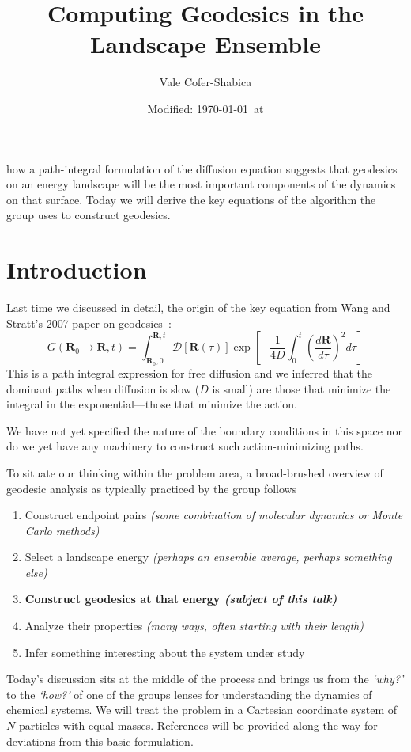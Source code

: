 \documentclass[letterpaper]{tufte-handout}
\title{Computing Geodesics in the Landscape Ensemble}
\date{Modified: \today\ at \currenttime}
\author{Vale Cofer-Shabica}
\newcommand{\laeq}[1]{\label{eqn:#1}}
\renewcommand{\vec}[1]{\mathbf{#1}}
\begin{document}
\maketitle

 how a path-integral formulation of the diffusion equation suggests that geodesics on an energy landscape will be the most important components of the dynamics on that surface. Today we will derive the key equations of the algorithm the group uses to construct geodesics.

\section{Introduction}
Last time we discussed in detail, the origin of the key equation from Wang and Stratt's 2007 paper on geodesics~\cite[-1\baselineskip]{wang:2007:geodesics}:
\begin{equation}\laeq{pathd}
G(\vec{R}_{0} \to \vec{R} , t) = \int_{\vec{R}_{0},0}^{\vec{R},t} \mathscr{D} [\vec{R}(\tau)]\exp\left[ -\frac{1}{4D} \int_{0}^{t} {\left(\frac{d\vec{R}}{d\tau} \right)}^{2} d\tau\right] 
\end{equation}
This is a path integral expression for free diffusion and we inferred that the dominant paths when diffusion is slow ($D$ is small) are those that minimize the integral in the exponential---those that minimize the action.

We have not yet specified the nature of the boundary conditions in this space nor do we yet have any machinery to construct such action-minimizing paths.

To situate our thinking within the problem area, a broad-brushed overview of geodesic analysis as typically practiced by the group follows
\begin{enumerate}
  \item Construct endpoint pairs \emph{(some combination of molecular dynamics or Monte Carlo methods)}
  \item Select a landscape energy \emph{(perhaps an ensemble average, perhaps something else)}
  \item \textbf{Construct geodesics at that energy \emph{(subject of this talk)}}
  \item Analyze their properties \emph{(many ways, often starting with their length)}
  \item Infer something interesting about the system under study
\end{enumerate}
Today's discussion sits at the middle of the process and brings us from the \emph{`why?'} to the \emph{`how?'} of one of the groups lenses for understanding the dynamics of chemical systems. We will treat the problem in a Cartesian coordinate system of $N$ particles with equal masses. References will be provided along the way for deviations from this basic formulation.
\end{document}
